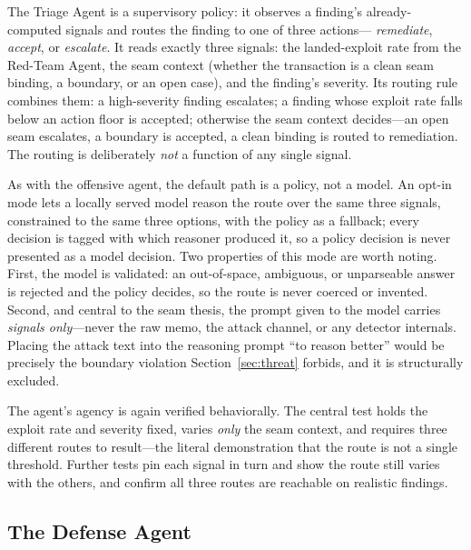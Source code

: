 \documentclass[10pt,twocolumn]{article}
\begin{document}
The Triage Agent is a supervisory policy: it observes a finding's
already-computed signals and routes the finding to one of three actions---
\emph{remediate}, \emph{accept}, or \emph{escalate}. It reads exactly three
signals: the landed-exploit rate from the Red-Team Agent, the seam context
(whether the transaction is a clean seam binding, a boundary, or an open case),
and the finding's severity. Its routing rule combines them: a high-severity
finding escalates; a finding whose exploit rate falls below an action floor is
accepted; otherwise the seam context decides---an open seam escalates, a
boundary is accepted, a clean binding is routed to remediation. The routing is
deliberately \emph{not} a function of any single signal.

As with the offensive agent, the default path is a policy, not a model. An opt-in
mode lets a locally served model reason the route over the same three signals,
constrained to the same three options, with the policy as a fallback; every
decision is tagged with which reasoner produced it, so a policy decision is never
presented as a model decision. Two properties of this mode are worth noting.
First, the model is validated: an out-of-space, ambiguous, or unparseable answer
is rejected and the policy decides, so the route is never coerced or invented.
Second, and central to the seam thesis, the prompt given to the model carries
\emph{signals only}---never the raw memo, the attack channel, or any detector
internals. Placing the attack text into the reasoning prompt ``to reason better''
would be precisely the boundary violation Section~\ref{sec:threat} forbids, and it is
structurally excluded.

The agent's agency is again verified behaviorally. The central test holds the
exploit rate and severity fixed, varies \emph{only} the seam context, and
requires three different routes to result---the literal demonstration that the
route is not a single threshold. Further tests pin each signal in turn and show
the route still varies with the others, and confirm all three routes are
reachable on realistic findings.

\subsection{The Defense Agent}
\end{document}
